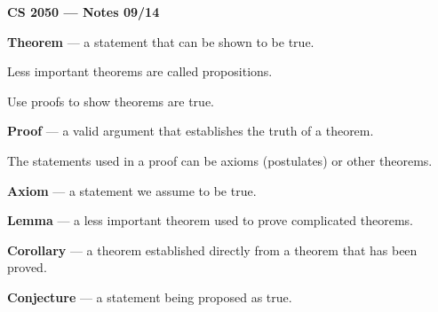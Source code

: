 \documentclass{article}
\begin{document}
\textbf{CS 2050 --- Notes 09/14}

\bigskip

\textbf{Theorem} --- a statement that can be shown to be true.

\medskip

Less important theorems are called propositions.

\medskip

Use proofs to show theorems are true.

\bigskip

\textbf{Proof} --- a valid argument that establishes the truth of a theorem.

\medskip

The statements used in a proof can be axioms (postulates) or other theorems.

\medskip

\textbf{Axiom} --- a statement we assume to be true.

\bigskip

\textbf{Lemma} --- a less important theorem used to prove complicated theorems.

\medskip

\textbf{Corollary} --- a theorem established directly from a theorem that has been proved.

\medskip

\textbf{Conjecture} --- a statement being proposed as true.
\end{document}
